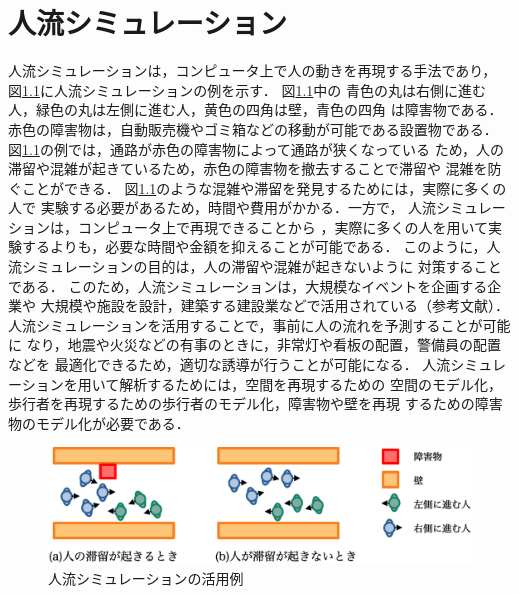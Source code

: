 
\newcommand{\figtb}[5]{ %
\begin{figure}[tb]
  \begin{center}
    \texttt{[image: figure/\#4]}
    \caption{#1}
    \ecaption{#2}
    \label{fig:#5}
  \end{center}
\end{figure}}
\newcommand{\eq}[1]{式（\ref{eq:#1}）}
\chapter{人流シミュレーション}
\label{sec:background}
人流シミュレーションは，コンピュータ上で人の動きを再現する手法であり，
図\ref{fig:jinryu_image}に人流シミュレーションの例を示す．
図\ref{fig:jinryu_image}中の
青色の丸は右側に進む人，緑色の丸は左側に進む人，黄色の四角は壁，青色の四角
は障害物である．
赤色の障害物は，自動販売機やゴミ箱などの移動が可能である設置物である．
図\ref{fig:jinryu_image}の例では，通路が赤色の障害物によって通路が狭くなっている
ため，人の滞留や混雑が起きているため，赤色の障害物を撤去することで滞留や
混雑を防ぐことができる．
図\ref{fig:jinryu_image}のような混雑や滞留を発見するためには，実際に多くの人で
実験する必要があるため，時間や費用がかかる．一方で，
人流シミュレーションは，コンピュータ上で再現できることから
，実際に多くの人を用いて実験するよりも，必要な時間や金額を抑えることが可能である．
このように，人流シミュレーションの目的は，人の滞留や混雑が起きないように
対策することである．
このため，人流シミュレーションは，大規模なイベントを企画する企業や
大規模や施設を設計，建築する建設業などで活用されている（参考文献）．
人流シミュレーションを活用することで，事前に人の流れを予測することが可能に
なり，地震や火災などの有事のときに，非常灯や看板の配置，警備員の配置などを
最適化できるため，適切な誘導が行うことが可能になる．
人流シミュレーションを用いて解析するためには，空間を再現するための
空間のモデル化，歩行者を再現するための歩行者のモデル化，障害物や壁を再現
するための障害物のモデル化が必要である．

\begin{figure}[h]
    \begin{center}
     \includegraphics[width=14cm,clip]{figure/jinryu_image2_r2.eps}
     \caption{人流シミュレーションの活用例}
     \label{fig:jinryu_image}
    \end{center}
\end{figure}



